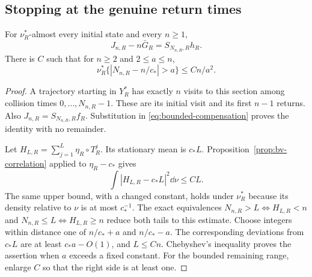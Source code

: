 \subsection{Stopping at the genuine return times}
\begin{lemma}
\label{lem:stopped-compensation}
For $\nu_R^*$-almost every initial state and every $n\ge1$,
\begin{equation}\label{eq:exact-stopped-compensation}
 J_{n,R}-n\bar G_R=S_{N_{n,R},R}h_R.
\end{equation}
There is $C$ such that for $n\ge2$ and $2\le a\le n$,
\begin{equation}\label{eq:return-clock-window}
 \nu_R^*\{|N_{n,R}-n/c_*|>a\}\le Cn/a^2.
\end{equation}
\end{lemma}
\begin{proof}
A trajectory starting in $Y_R^*$ has exactly $n$ visits to this section
among collision times $0,\ldots,N_{n,R}-1$. These are its initial visit
and its first $n-1$ returns. Also
$J_{n,R}=S_{N_{n,R},R}f_R$. Substitution in
\eqref{eq:bounded-compensation} proves the identity with no remainder.

Let $H_{L,R}=\sum_{j=1}^L\eta_R\circ T_R^j$. Its stationary mean is
$c_*L$. Proposition~\ref{prop:bv-correlation} applied to
$\eta_R-c_*$ gives
\[
 \int|H_{L,R}-c_*L|^2\dd\nu\le CL.
\]
The same upper bound, with a changed constant, holds under $\nu_R^*$
because its density relative to $\nu$ is at most $c_*^{-1}$.
The exact equivalences
$N_{n,R}>L\iff H_{L,R}<n$ and
$N_{n,R}\le L\iff H_{L,R}\ge n$ reduce both tails to this estimate.
Choose integers within distance one of $n/c_*+a$ and $n/c_*-a$.
The corresponding deviations from $c_*L$ are at least $c_*a-O(1)$,
and $L\le Cn$. Chebyshev's inequality proves the assertion when $a$
exceeds a fixed constant. For the bounded remaining range, enlarge
$C$ so that the right side is at least one.
\end{proof}

